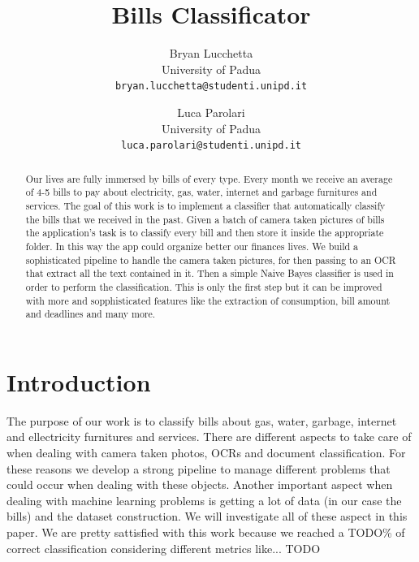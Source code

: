 \documentclass[10pt,twocolumn,letterpaper]{article}
\begin{document}
\title{Bills Classificator}

\author{Bryan Lucchetta\\
{\small University of Padua}\\
{\tt\small bryan.lucchetta@studenti.unipd.it}
\and
Luca Parolari\\
{\small University of Padua}\\
{\tt\small luca.parolari@studenti.unipd.it}
}

\maketitle

\begin{abstract}
   Our lives are fully immersed by bills of every type. Every month we receive an average of 4-5 bills to pay about electricity, gas, water, internet and garbage furnitures and services. The goal of this work is to implement a classifier that automatically classify the bills that we received in the past. Given a batch of camera taken pictures of bills the application's task is to classify every bill and then store it inside the appropriate folder. In this way the app could organize better our finances lives. We build a sophisticated pipeline to handle the camera taken pictures, for then passing to an OCR that extract all the text contained in it. Then a simple Naive Bayes classifier is used in order to perform the classification. This is only the first step but it can be improved with more and sopphisticated features like the extraction of consumption, bill amount and deadlines and many more.
\end{abstract}

\section{Introduction}

The purpose of our work is to classify bills about gas, water, garbage, internet and ellectricity furnitures and services. There are different aspects to take care of when dealing with camera taken photos, OCRs and document classification. For these reasons we develop a strong pipeline to manage different problems that could occur when dealing with these objects. Another important aspect when dealing with machine learning problems is getting a lot of data (in our case the bills) and the dataset construction. We will investigate all of these aspect in this paper. We are pretty sattisfied with this work because we reached a TODO\% of correct classification considering different metrics like... TODO    
\end{document}
